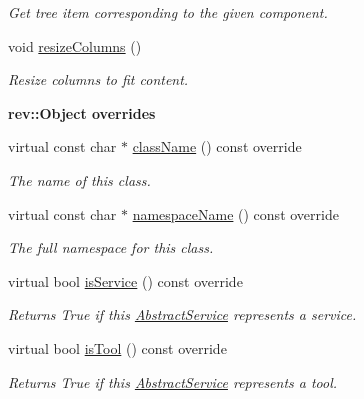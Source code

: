 \begin{Indent}
\begin{DoxyCompactItemize}
\begin{DoxyCompactList}\small\item\em Get tree item corresponding to the given component. \end{DoxyCompactList}\item 
\mbox{\label{classrev_1_1_view_1_1_component_tree_widget_a7352bceef0866e375c925bc2c8ef5bab}} 
void \mbox{\hyperlink{classrev_1_1_view_1_1_component_tree_widget_a7352bceef0866e375c925bc2c8ef5bab}{resize\+Columns}} ()
\begin{DoxyCompactList}\small\item\em Resize columns to fit content. \end{DoxyCompactList}\end{DoxyCompactItemize}
\end{Indent}
\begin{Indent}\textbf{ rev\+::Object overrides}\par
\begin{DoxyCompactItemize}
\item 
virtual const char $\ast$ \mbox{\hyperlink{classrev_1_1_view_1_1_component_tree_widget_a906360e88a18432b36c9d769a8e3886c}{class\+Name}} () const override
\begin{DoxyCompactList}\small\item\em The name of this class. \end{DoxyCompactList}\item 
virtual const char $\ast$ \mbox{\hyperlink{classrev_1_1_view_1_1_component_tree_widget_aabf1838a1bf9240def872d8526b3aa4b}{namespace\+Name}} () const override
\begin{DoxyCompactList}\small\item\em The full namespace for this class. \end{DoxyCompactList}\item 
virtual bool \mbox{\hyperlink{classrev_1_1_view_1_1_component_tree_widget_a1811835dc4d0be8a33bbe261299e1744}{is\+Service}} () const override
\begin{DoxyCompactList}\small\item\em Returns True if this \mbox{\hyperlink{classrev_1_1_abstract_service}{Abstract\+Service}} represents a service. \end{DoxyCompactList}\item 
virtual bool \mbox{\hyperlink{classrev_1_1_view_1_1_component_tree_widget_a9f0f92a353582f6efe343ea4e5d1e9b8}{is\+Tool}} () const override
\begin{DoxyCompactList}\small\item\em Returns True if this \mbox{\hyperlink{classrev_1_1_abstract_service}{Abstract\+Service}} represents a tool. \end{DoxyCompactList}\end{DoxyCompactItemize}
\end{Indent}
